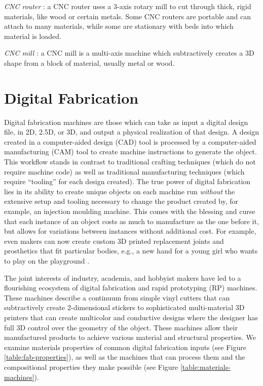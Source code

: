 \emph{CNC router} : a CNC router uses a 3-axis rotary mill to cut through thick, rigid materials, like wood or certain metals. Some CNC routers are portable and can attach to many materials, while some are stationary with beds into which material is loaded.

\emph{CNC mill} : a CNC mill is a multi-axis machine which subtractively creates a 3D shape from a block of material, usually metal or wood.

\section{Digital Fabrication}

Digital fabrication machines are those which can take as input a digital design file, in 2D, 2.5D, or 3D, and output a physical realization of that design. A design created in a computer-aided design (CAD) tool is processed by a computer-aided manufacturing (CAM) tool to create machine instructions to generate the object. This workflow stands in contrast to traditional crafting techniques (which do not require machine code) as well as traditional manufacturing techniques (which require ``tooling'' for each design created). The true power of digital fabrication lies in its ability to create unique objects on each machine run \emph{without} the extensive setup and tooling necessary to change the product created by, for example, an injection moulding machine. This comes with the blessing and curse that each instance of an object costs as much to manufacture as the one before it, but allows for variations between instances without additional cost. For example, even makers can now create custom 3D printed replacement joints and prosthetics that fit particular bodies, e.g., a new hand for a young girl who wants to play on the playground \cite{myers-sophie}.

The joint interests of industry, academia, and hobbyist makers have led to a flourishing ecosystem of digital fabrication and rapid prototyping (RP) machines. These machines describe a continuum from simple vinyl cutters that can subtractively create 2-dimensional stickers to sophisticated multi-material 3D printers that can create multicolor and conductive designs where the designer has full 3D control over the geometry of the object. These machines allow their manufactured products to achieve various material and structural properties. We examine materials properties of common digital fabrication inputs (see Figure \ref{table:fab-properties}), as well as the machines that can process them and the compositional properties they make possible (see Figure \ref{table:materials-machines}).

